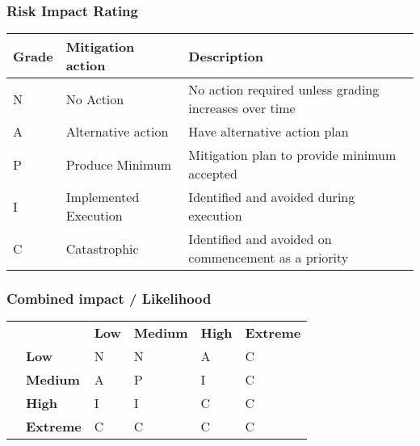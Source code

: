 	\vspace{3mm}	
		
	\subsubsection*{Risk Impact Rating}
	\vspace{2mm}
	
	   	\begin{tabularx}{1.0\textwidth}{ | >{\scriptsize}l | >{\scriptsize}p{50mm} | >{\scriptsize}X |}
			\hline
			
			\textbf{Grade} 	& \textbf{Mitigation action} 	& \textbf{Description} 										\\ \hline
			N 				& No Action 					& No action required unless grading increases over time		\\ \hline
			\rowcolor[gray]{.98}
			A 				& Alternative action			& Have alternative action plan								\\ \hline
			P 				& Produce Minimum				& Mitigation plan to provide minimum accepted				\\ \hline
			\rowcolor[gray]{.98}
			I 				& Implemented Execution 		& Identified and avoided during execution					\\ \hline
			C   			& Catastrophic 					& Identified and avoided on commencement as a priority	 	\\ \hline

		\end{tabularx}
	
	\vspace{3mm}	
		
	\subsubsection*{Combined impact / Likelihood}
	\vspace{2mm}

		\begin{tabularx}{1.0\textwidth}{ | >{\scriptsize}p{30mm} | >{\scriptsize}p{30mm} | >{\scriptsize}X | >{\scriptsize}X | >{\scriptsize}X | >{\scriptsize}X |}  

			\hline

			& \multicolumn{5}{c|}{\scriptsize Impact}																										\\ \hline
			
			\multirow{5}{*}{Likelihood} 	&  					& \textbf{Low} 			& \textbf{Medium} 		& \textbf{High}		& \textbf{Extreme} 			\\ \cline{2-6}
											& \textbf{Low}		& N						& N						& A					& C							\\ \cline{2-6}
											& \textbf{Medium}	& A						& P						& I					& C							\\ \cline{2-6}
											& \textbf{High}		& I						& I						& C					& C							\\ \cline{2-6}
											& \textbf{Extreme}	& C						& C						& C					& C							\\ \hline

		\end{tabularx}
	
